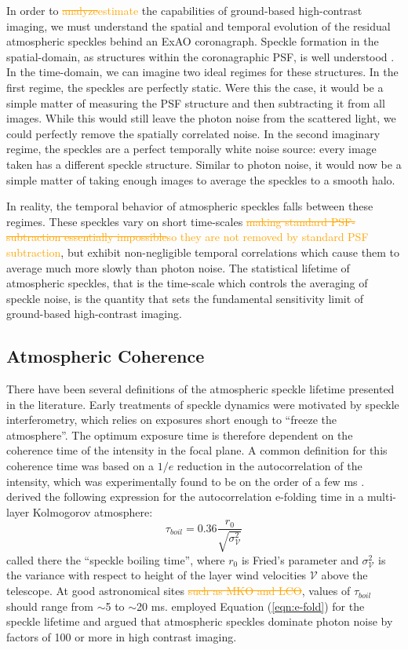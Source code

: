 \documentclass[10pt,preprint]{aastex631}
\newcommand{\ogadd}[1]{\textcolor{orange}{#1}}
\newcommand{\ogrmv}[1]{\textcolor{orange}{\sout{#1}}}
\begin{document}
In order to \ogrmv{analyze}\ogadd{estimate} the capabilities of ground-based high-contrast imaging, we must understand the spatial and temporal evolution of the residual atmospheric speckles behind an ExAO coronagraph.  Speckle formation in the spatial-domain, as structures within the coronagraphic PSF, is well understood \citep{2001ApJ...558L..71B,2003ApJ...596..702P,2007ApJ...669..642S}.  In the time-domain, we can imagine two ideal regimes for these structures.  In the first regime, the speckles are perfectly static.  Were this the case, it would be a simple matter of measuring the PSF structure and then subtracting it from all images.  While this would still leave the photon noise from the scattered light, we could perfectly remove the spatially correlated noise.  In the second imaginary regime, the speckles are a perfect temporally white noise source: every image taken has a different speckle structure.  Similar to photon noise, it would now be a simple matter of taking enough images to average the speckles to a smooth halo.

In reality, the temporal behavior of atmospheric speckles falls between these regimes. These speckles vary on short time-scales \ogrmv{making standard PSF-subtraction essentially impossible}\ogadd{so they are not removed by standard PSF subtraction}, but exhibit non-negligible temporal correlations which cause them to average much more slowly than photon noise.  The statistical lifetime of atmospheric speckles, that is the time-scale which controls the averaging of speckle noise, is the quantity that sets the fundamental sensitivity limit of ground-based high-contrast imaging.

\subsection{Atmospheric Coherence}
There have been several definitions of the atmospheric speckle lifetime presented in the literature.  Early treatments of speckle dynamics were motivated by speckle interferometry, which relies on exposures short enough to ``freeze the atmosphere''.  The optimum exposure time is therefore dependent on the coherence time of the intensity in the focal plane.  A common definition for this coherence time was based on a $1/e$ reduction in the autocorrelation of the intensity, which was experimentally found to be on the order of a few ms \citep{1978ApOpt..17.3779S,1990JMOp...37.1247D}.    \citet{1982JOpt...13..263R} derived the following expression for the autocorrelation e-folding time in a multi-layer Kolmogorov atmosphere:
\begin{equation}
\tau_{boil} = 0.36 \frac{r_0}{\sqrt{\sigma^2_\mathcal{V}}}
\label{eqn:e-fold}
\end{equation}
called there the ``speckle boiling time'', where $r_0$ is Fried's parameter and $\sigma^2_\mathcal{V}$ is the variance with respect to height of the layer wind velocities $\mathcal{V}$  above the telescope.  At good astronomical sites \ogrmv{such as MKO and LCO}, values of $\tau_{boil}$ should range from $\sim$5 to $\sim$20 ms. \citet{1999PASP..111..587R} employed Equation (\ref{eqn:e-fold}) for the speckle lifetime and argued that atmospheric speckles dominate photon noise by factors of 100 or more in high contrast imaging.
\end{document}
